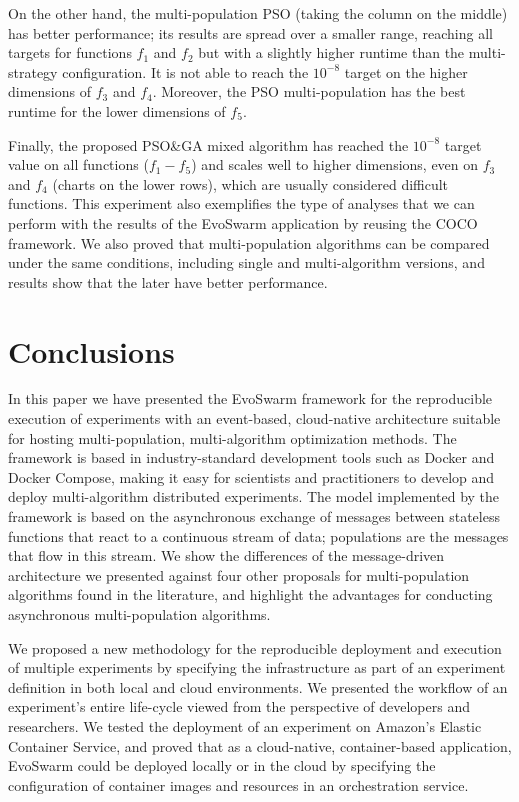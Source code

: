 \documentclass[review]{elsarticle}
\begin{document}
On the other hand, the multi-population PSO (taking the column on the middle) 
has better performance; its results are spread over a smaller range,
reaching all targets for functions $f_1$ and $f_2$ but with a slightly higher
runtime than the multi-strategy configuration. It is not able to reach the
$10^{-8}$ target on the higher dimensions of $f_3$ and $f_4$. Moreover, the PSO
multi-population has the best runtime for the lower dimensions of $f_5$.

Finally, the proposed PSO\&GA mixed algorithm has reached the $10^{-8}$ target
value on all functions ($f_1-f_5$) and scales well to higher dimensions, even on
$f_3$ and $f_4$ (charts on the lower rows), which are usually considered
difficult functions. This experiment also exemplifies the type of analyses that
we can perform with the results of the EvoSwarm application by reusing the COCO framework.
We also proved that multi-population algorithms can be compared under the same 
conditions, including single and multi-algorithm versions, and results show 
that the later have better performance.


\section{Conclusions} 
\label{conclusions}

In this paper we have presented the EvoSwarm framework for 
the reproducible execution of experiments with an event-based, cloud-native architecture 
suitable for hosting multi-population, multi-algorithm optimization
methods. 
The framework is based in industry-standard development
tools such as Docker and Docker Compose, making it easy for scientists and practitioners to develop and deploy
multi-algorithm distributed experiments. The model implemented by the
framework is based on the asynchronous
exchange of messages between stateless functions that react to a continuous
stream of data; populations are the messages that flow in this stream. We show the differences of the message-driven architecture we presented against
four other proposals for multi-population algorithms found in the literature, and highlight the 
advantages for conducting asynchronous multi-population algorithms.

We proposed a new methodology for the reproducible deployment and execution of
multiple experiments by specifying the infrastructure as part of an experiment
definition in both local and cloud environments. We presented the workflow of an
experiment's entire life-cycle viewed from the perspective of developers and
researchers. 
We tested the deployment of an experiment on Amazon's Elastic
Container Service, and proved that as a cloud-native, container-based application,
EvoSwarm could be deployed locally or in the cloud by specifying the configuration 
of container images and resources in an orchestration service.
\end{document}
